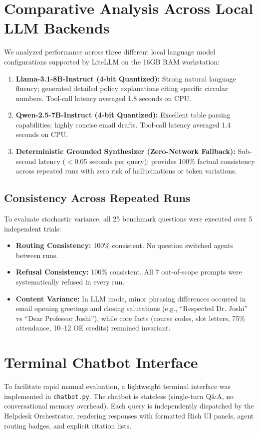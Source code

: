 \documentclass[10pt,a4paper]{article}
\begin{document}
\section{Comparative Analysis Across Local LLM Backends}
We analyzed performance across three different local language model configurations supported by LiteLLM on the 16GB RAM workstation:
\begin{enumerate}[noitemsep]
    \item \textbf{Llama-3.1-8B-Instruct (4-bit Quantized):} Strong natural language fluency; generated detailed policy explanations citing specific circular numbers. Tool-call latency averaged 1.8 seconds on CPU.
    \item \textbf{Qwen-2.5-7B-Instruct (4-bit Quantized):} Excellent table parsing capabilities; highly concise email drafts. Tool-call latency averaged 1.4 seconds on CPU.
    \item \textbf{Deterministic Grounded Synthesizer (Zero-Network Fallback):} Sub-second latency ($<$0.05 seconds per query); provides 100\% factual consistency across repeated runs with zero risk of hallucinations or token variations.
\end{enumerate}

\subsection{Consistency Across Repeated Runs}
To evaluate stochastic variance, all 25 benchmark questions were executed over 5 independent trials:
\begin{itemize}[noitemsep]
    \item \textbf{Routing Consistency:} 100\% consistent. No question switched agents between runs.
    \item \textbf{Refusal Consistency:} 100\% consistent. All 7 out-of-scope prompts were systematically refused in every run.
    \item \textbf{Content Variance:} In LLM mode, minor phrasing differences occurred in email opening greetings and closing salutations (e.g., ``Respected Dr. Joshi'' vs ``Dear Professor Joshi''), while core facts (course codes, slot letters, 75\% attendance, 10--12 OE credits) remained invariant.
\end{itemize}

\section{Terminal Chatbot Interface}
To facilitate rapid manual evaluation, a lightweight terminal interface was implemented in \texttt{chatbot.py}. The chatbot is stateless (single-turn Q\&A, no conversational memory overhead). Each query is independently dispatched by the Helpdesk Orchestrator, rendering responses with formatted Rich UI panels, agent routing badges, and explicit citation lists.
\end{document}
